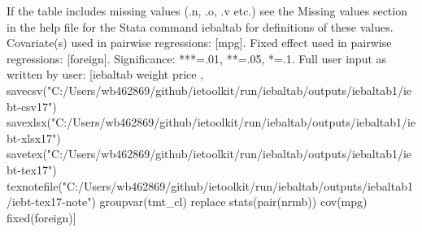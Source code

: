 If the table includes missing values (.n, .o, .v etc.) see the Missing values section in the help file for the Stata command iebaltab for definitions of these values. Covariate(s) used in pairwise regressions: [mpg]. Fixed effect used in pairwise regressions: [foreign]. Significance: ***=.01, **=.05, *=.1. Full user input as written by user: [iebaltab weight price , savecsv("C:/Users/wb462869/github/ietoolkit/run/iebaltab/outputs/iebaltab1/iebt-csv17") savexlsx("C:/Users/wb462869/github/ietoolkit/run/iebaltab/outputs/iebaltab1/iebt-xlsx17") savetex("C:/Users/wb462869/github/ietoolkit/run/iebaltab/outputs/iebaltab1/iebt-tex17") texnotefile("C:/Users/wb462869/github/ietoolkit/run/iebaltab/outputs/iebaltab1/iebt-tex17-note") groupvar(tmt\_cl) replace stats(pair(nrmb)) cov(mpg) fixed(foreign)] 
